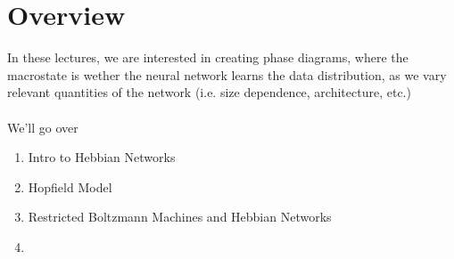 \section{Overview}
In these lectures, we are interested in creating phase diagrams, where the macrostate is wether the neural network learns the data distribution, as we vary relevant quantities of the network (i.e. size dependence, architecture, etc.)\\
\\
We'll go over
\begin{enumerate}
	\item Intro to Hebbian Networks
	\item Hopfield Model
	\item Restricted Boltzmann Machines and Hebbian Networks
	\item 
\end{enumerate}
